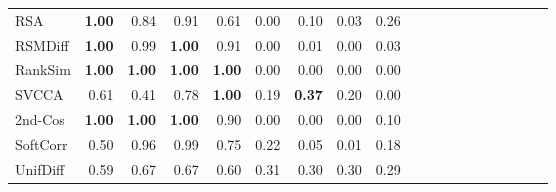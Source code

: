 \begin{tabular}{l||rrr|rrr|rrr||rrr|rrr|rrr}
RSA & \textbf{1.00} & 0.84 & 0.91 & 0.61 & 0.00 & 0.10 & 0.03 & 0.26 \\
RSMDiff & \textbf{1.00} & 0.99 & \textbf{1.00} & 0.91 & 0.00 & 0.01 & 0.00 & 0.03 \\
RankSim & \textbf{1.00} & \textbf{1.00} & \textbf{1.00} & \textbf{1.00} & 0.00 & 0.00 & 0.00 & 0.00 \\
SVCCA & 0.61 & 0.41 & 0.78 & \textbf{1.00} & 0.19 & \textbf{0.37} & 0.20 & 0.00 \\
2nd-Cos & \textbf{1.00} & \textbf{1.00} & \textbf{1.00} & 0.90 & 0.00 & 0.00 & 0.00 & 0.10 \\
SoftCorr & 0.50 & 0.96 & 0.99 & 0.75 & 0.22 & 0.05 & 0.01 & 0.18 \\
UnifDiff & 0.59 & 0.67 & 0.67 & 0.60 & 0.31 & 0.30 & 0.30 & 0.29 \\
\bottomrule
\end{tabular}
